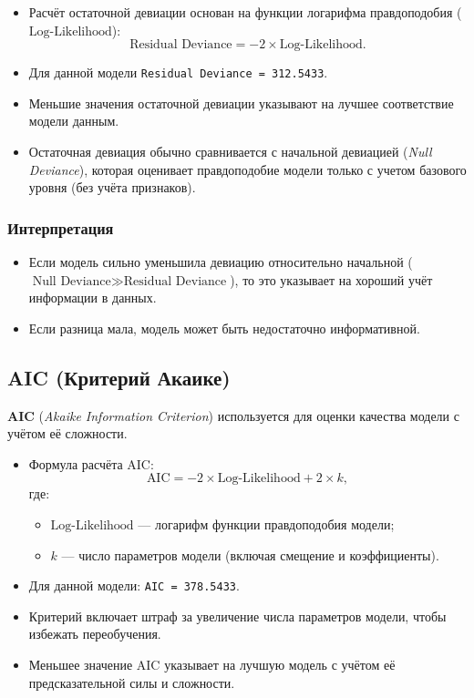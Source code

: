 \begin{itemize}
	\item Расчёт остаточной девиации основан на функции логарифма правдоподобия (\( \text{Log-Likelihood} \)):
	\[
	\text{Residual Deviance} = -2 \times \text{Log-Likelihood}.
	\]
	\item Для данной модели \texttt{Residual Deviance = 312.5433}.
	\item Меньшие значения остаточной девиации указывают на лучшее соответствие модели данным.
	\item Остаточная девиация обычно сравнивается с начальной девиацией (\textit{Null Deviance}), которая оценивает правдоподобие модели только с учетом базового уровня (без учёта признаков).
\end{itemize}

\subsubsection*{Интерпретация}
\begin{itemize}
	\item Если модель сильно уменьшила девиацию относительно начальной (\( \text{Null Deviance} \gg \text{Residual Deviance} \)), то это указывает на хороший учёт информации в данных.
	\item Если разница мала, модель может быть недостаточно информативной.
\end{itemize}

\subsection*{AIC (Критерий Акаике)}

\textbf{AIC} (\textit{Akaike Information Criterion}) используется для оценки качества модели с учётом её сложности. 

\begin{itemize}
	\item Формула расчёта AIC:
	\[
	\text{AIC} = -2 \times \text{Log-Likelihood} + 2 \times k,
	\]
	где:
	\begin{itemize}
		\item \( \text{Log-Likelihood} \) — логарифм функции правдоподобия модели;
		\item \( k \) — число параметров модели (включая смещение и коэффициенты).
	\end{itemize}
	\item Для данной модели: \texttt{AIC = 378.5433}.
	\item Критерий включает штраф за увеличение числа параметров модели, чтобы избежать переобучения.
	\item Меньшее значение AIC указывает на лучшую модель с учётом её предсказательной силы и сложности.
\end{itemize}

